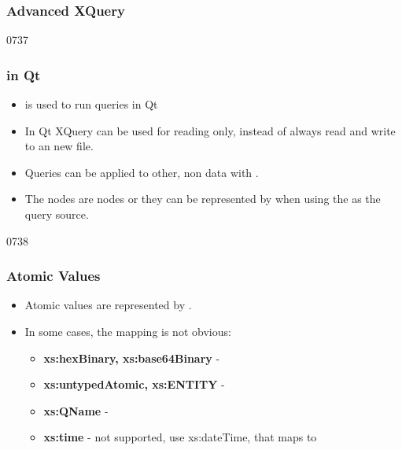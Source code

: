 \label{XQuery-advanced}

\subsubsection{Advanced XQuery}

\begin{slide}{0737}
\frametitle{ in Qt}
\begin{itemize}
\item {} is used to run  queries in Qt
\item In Qt XQuery can be used for reading only, instead of always read and write to an new  file.
\item Queries can be applied to other, non  data with .
\item The nodes are  nodes or they can be represented by  when using the  as the query source.
\end{itemize}
\end{slide}

\begin{slide}{0738}
\frametitle{Atomic Values}
\begin{itemize}
\item Atomic values are represented by .
\item In some cases, the mapping is not obvious:

\begin{itemize}
\item \textbf{xs:hexBinary, xs:base64Binary} - 
\item \textbf{xs:untypedAtomic, xs:ENTITY} - 
\item \textbf{xs:QName} - 
\item \textbf{xs:time} - not supported, use  xs:dateTime, that maps to 
\end{itemize}

\end{itemize}
\end{slide}

